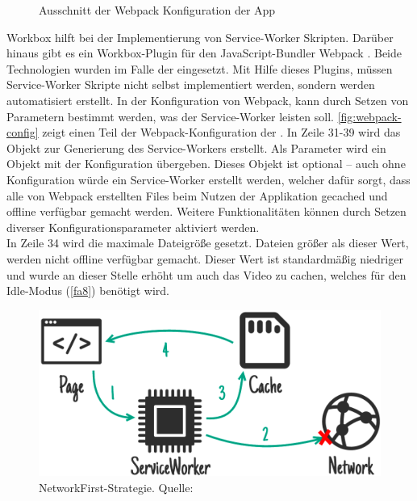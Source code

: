 \begin{figure}
  
  \caption{Ausschnitt der Webpack Konfiguration der \shst{} App}
  \label{fig:webpack-config}
\end{figure}

Workbox hilft bei der Implementierung von Service-Worker Skripten. Darüber hinaus gibt es ein 
Workbox-Plugin \cite{workbox-webpack-plugin} für den JavaScript-Bundler Webpack \cite{webpack}. 
Beide Technologien wurden im Falle der \shst{} eingesetzt. Mit Hilfe dieses Plugins, müssen 
Service-Worker Skripte nicht selbst implementiert werden, sondern werden automatisiert erstellt.
In der Konfiguration von Webpack, kann durch Setzen von Parametern bestimmt werden, was
der Service-Worker leisten soll. \autoref{fig:webpack-config} zeigt einen Teil der 
Webpack-Konfiguration der \shst{}. In Zeile 31-39 wird das Objekt zur Generierung des
Service-Workers erstellt. Als Parameter wird ein Objekt mit der Konfiguration übergeben. 
Dieses Objekt ist optional -- auch ohne Konfiguration würde ein Service-Worker erstellt werden,
welcher dafür sorgt, dass alle von Webpack erstellten Files beim Nutzen der Applikation
gecached und offline verfügbar gemacht werden. Weitere Funktionalitäten können durch
Setzen diverser Konfigurationsparameter aktiviert werden.\\
In Zeile 34 wird die maximale Dateigröße gesetzt. 
Dateien größer als dieser Wert, werden nicht offline verfügbar gemacht. Dieser Wert
ist standardmäßig niedriger und wurde an dieser Stelle erhöht um auch das Video zu cachen, welches
für den Idle-Modus (\ref{fa8}) benötigt wird.

\begin{figure}
    \centering
    \includegraphics[width=1\textwidth]{figures/images/ss-network-falling-back-to-cache.png}
    \caption{NetworkFirst-Strategie. Quelle: \cite{offline-cookbook}}
    \label{fig:network-first}
\end{figure}

